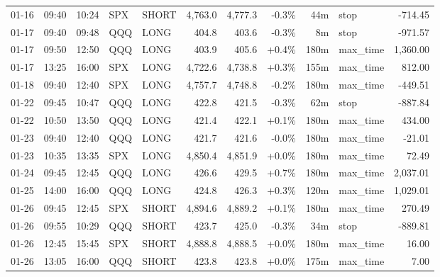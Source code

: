 \documentclass[11pt,a4paper,twoside]{article}
\begin{document}
\begin{center}
\begin{longtable}{>{\color{txtmain}}l l l l l r r r r >{\color{txtmain}}l r}
01-16 & 09:40 & 10:24 & SPX & SHORT & 4,763.0 & 4,777.3 & \textcolor{lossred}{-0.3\%} & 44m & stop & \textcolor{lossred}{-714.45} \\
01-17 & 09:40 & 09:48 & QQQ & LONG & 404.8 & 403.6 & \textcolor{lossred}{-0.3\%} & 8m & stop & \textcolor{lossred}{-971.57} \\
01-17 & 09:50 & 12:50 & QQQ & LONG & 403.9 & 405.6 & \textcolor{wingreen}{+0.4\%} & 180m & max\_time & \textcolor{wingreen}{1,360.00} \\
01-17 & 13:25 & 16:00 & SPX & LONG & 4,722.6 & 4,738.8 & \textcolor{wingreen}{+0.3\%} & 155m & max\_time & \textcolor{wingreen}{812.00} \\
01-18 & 09:40 & 12:40 & SPX & LONG & 4,757.7 & 4,748.8 & \textcolor{lossred}{-0.2\%} & 180m & max\_time & \textcolor{lossred}{-449.51} \\
01-22 & 09:45 & 10:47 & QQQ & LONG & 422.8 & 421.5 & \textcolor{lossred}{-0.3\%} & 62m & stop & \textcolor{lossred}{-887.84} \\
01-22 & 10:50 & 13:50 & QQQ & LONG & 421.4 & 422.1 & \textcolor{wingreen}{+0.1\%} & 180m & max\_time & \textcolor{wingreen}{434.00} \\
01-23 & 09:40 & 12:40 & QQQ & LONG & 421.7 & 421.6 & \textcolor{lossred}{-0.0\%} & 180m & max\_time & \textcolor{lossred}{-21.01} \\
01-23 & 10:35 & 13:35 & SPX & LONG & 4,850.4 & 4,851.9 & \textcolor{wingreen}{+0.0\%} & 180m & max\_time & \textcolor{wingreen}{72.49} \\
01-24 & 09:45 & 12:45 & QQQ & LONG & 426.6 & 429.5 & \textcolor{wingreen}{+0.7\%} & 180m & max\_time & \textcolor{wingreen}{2,037.01} \\
01-25 & 14:00 & 16:00 & QQQ & LONG & 424.8 & 426.3 & \textcolor{wingreen}{+0.3\%} & 120m & max\_time & \textcolor{wingreen}{1,029.01} \\
01-26 & 09:45 & 12:45 & SPX & SHORT & 4,894.6 & 4,889.2 & \textcolor{wingreen}{+0.1\%} & 180m & max\_time & \textcolor{wingreen}{270.49} \\
01-26 & 09:55 & 10:29 & QQQ & SHORT & 423.7 & 425.0 & \textcolor{lossred}{-0.3\%} & 34m & stop & \textcolor{lossred}{-889.81} \\
01-26 & 12:45 & 15:45 & SPX & SHORT & 4,888.8 & 4,888.5 & \textcolor{wingreen}{+0.0\%} & 180m & max\_time & \textcolor{wingreen}{16.00} \\
01-26 & 13:05 & 16:00 & QQQ & SHORT & 423.8 & 423.8 & \textcolor{wingreen}{+0.0\%} & 175m & max\_time & \textcolor{wingreen}{7.00} \\

\end{longtable}
\end{center}
\end{document}
